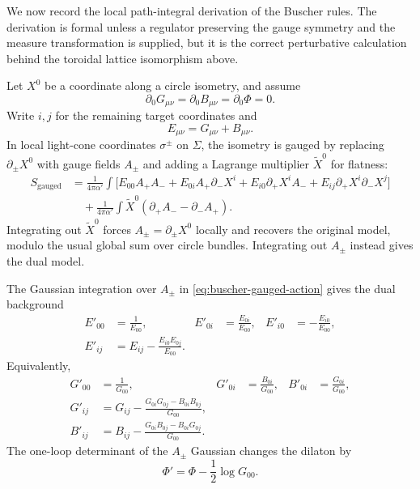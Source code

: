 We now record the local path-integral derivation of the Buscher rules.  The
derivation is formal unless a regulator preserving the gauge symmetry and
the measure transformation is supplied, but it is the correct perturbative
calculation behind the toroidal lattice isomorphism above.

Let \(X^0\) be a coordinate along a circle isometry, and assume
\[
  \partial_0G_{\mu\nu}
  =
  \partial_0B_{\mu\nu}
  =
  \partial_0\Phi
  =
  0.
\]
Write \(i,j\) for the remaining target coordinates and
\[
  E_{\mu\nu}=G_{\mu\nu}+B_{\mu\nu}.
\]
In local light-cone coordinates \(\sigma^\pm\) on \(\Sigma\), the
isometry is gauged by replacing \(\partial_\pm X^0\) with gauge fields
\(A_\pm\) and adding a Lagrange multiplier \(\widetilde X^0\) for flatness:
\begin{equation}
\begin{aligned}
  S_{\mathrm{gauged}}
  &=
  \frac1{4\pi\alpha'}
  \int
  \Big[
    E_{00}A_+A_-
    +E_{0i}A_+\partial_-X^i
    +E_{i0}\partial_+X^iA_-
    +E_{ij}\partial_+X^i\partial_-X^j
  \Big]
  \\
  &\quad
  +
  \frac1{4\pi\alpha'}
  \int
  \widetilde X^0
  (\partial_+A_- -\partial_-A_+).
\end{aligned}
  \label{eq:buscher-gauged-action}
\end{equation}
Integrating out \(\widetilde X^0\) forces \(A_\pm=\partial_\pm X^0\)
locally and recovers the original model, modulo the usual global sum over
circle bundles.  Integrating out \(A_\pm\) instead gives the dual model.

\begin{proposition}
\label{prop:buscher-rules}
The Gaussian integration over \(A_\pm\) in
\eqref{eq:buscher-gauged-action} gives the dual background
\begin{align}
  E'_{00}
  &=
  \frac1{E_{00}},
  &
  E'_{0i}
  &=
  \frac{E_{0i}}{E_{00}},
  &
  E'_{i0}
  &=
  -\frac{E_{i0}}{E_{00}},
  \label{eq:buscher-e-rules}\\
  E'_{ij}
  &=
  E_{ij}
  -
  \frac{E_{i0}E_{0j}}{E_{00}}.
  \label{eq:buscher-eij-rule}
\end{align}
Equivalently,
\begin{align}
  G'_{00}
  &=
  \frac1{G_{00}},
  &
  G'_{0i}
  &=
  \frac{B_{0i}}{G_{00}},
  &
  B'_{0i}
  &=
  \frac{G_{0i}}{G_{00}},
  \label{eq:buscher-g0i-b0i}\\
  G'_{ij}
  &=
  G_{ij}
  -
  \frac{G_{0i}G_{0j}-B_{0i}B_{0j}}{G_{00}},
  \label{eq:buscher-gij}\\
  B'_{ij}
  &=
  B_{ij}
  -
  \frac{G_{0i}B_{0j}-B_{0i}G_{0j}}{G_{00}} .
  \label{eq:buscher-bij}
\end{align}
The one-loop determinant of the \(A_\pm\) Gaussian changes the dilaton by
\begin{equation}
  \Phi'
  =
  \Phi-\frac12\log G_{00}.
  \label{eq:buscher-dilaton-shift}
\end{equation}
\end{proposition}

